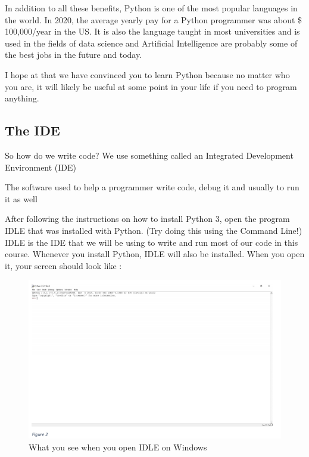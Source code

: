 In addition to all these benefits, Python is one of the most popular languages in the world. In 2020, the average yearly pay for a Python programmer was about \$ 100,000/year in the US. It is also the language taught in most universities and is used in the fields of data science and Artificial Intelligence are probably some of the best jobs in the future and today.

I hope at that we have convinced you to learn Python because no matter who you are, it will likely be useful at some point in your life if you need to program anything.

\subsection{The IDE}
So how do we write code? We use something called an Integrated Development Environment (IDE)

\begin{definition}[IDE]
The software used to help a programmer write code, debug it and usually to run it as well
\end{definition}

After following the instructions on how to install Python 3, open the program
IDLE that was installed with Python. (Try doing this using the Command Line!) IDLE is the IDE that we will be using to write and run most of our code in this course. Whenever you install Python, IDLE will also be installed. When you open it, your screen should look like :

\begin{figure}[h]
\centering\includegraphics[scale=0.5]{Chapter_One/Figures/b.png}
\caption{What you see when you open IDLE on Windows}
\label{fig:cmd} 
\end{figure}

